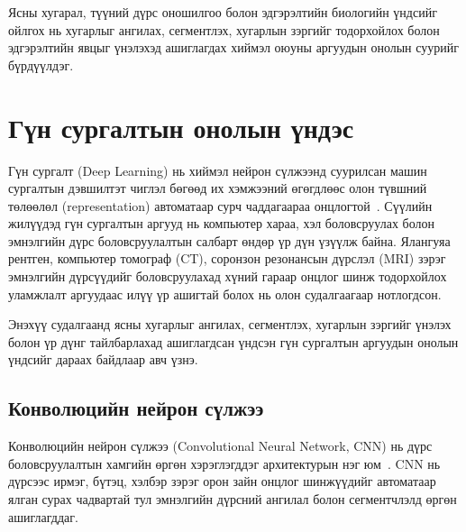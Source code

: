 Ясны хугарал, түүний дүрс оношилгоо болон эдгэрэлтийн биологийн үндсийг ойлгох нь хугарлыг ангилах, сегментлэх, хугарлын зэргийг тодорхойлох болон эдгэрэлтийн явцыг үнэлэхэд ашиглагдах хиймэл оюуны аргуудын онолын суурийг бүрдүүлдэг.

\section{Гүн сургалтын онолын үндэс}

Гүн сургалт (Deep Learning) нь хиймэл нейрон сүлжээнд суурилсан машин сургалтын дэвшилтэт чиглэл бөгөөд их хэмжээний өгөгдлөөс олон түвшний төлөөлөл (representation) автоматаар сурч чаддагаараа онцлогтой~\cite{ref31}. Сүүлийн жилүүдэд гүн сургалтын аргууд нь компьютер хараа, хэл боловсруулах болон эмнэлгийн дүрс боловсруулалтын салбарт өндөр үр дүн үзүүлж байна. Ялангуяа рентген, компьютер томограф (CT), соронзон резонансын дүрслэл (MRI) зэрэг эмнэлгийн дүрсүүдийг боловсруулахад хүний гараар онцлог шинж тодорхойлох уламжлалт аргуудаас илүү үр ашигтай болох нь олон судалгаагаар нотлогдсон.

Энэхүү судалгаанд ясны хугарлыг ангилах, сегментлэх, хугарлын зэргийг үнэлэх болон үр дүнг тайлбарлахад ашиглагдсан үндсэн гүн сургалтын аргуудын онолын үндсийг дараах байдлаар авч үзнэ.

\subsection*{Конволюцийн нейрон сүлжээ}

\begin{figure}[H]
    \centering
    \label{fig:cnn_arch}
\end{figure}

Конволюцийн нейрон сүлжээ (Convolutional Neural Network, CNN) нь дүрс боловсруулалтын хамгийн өргөн хэрэглэгддэг архитектурын нэг юм~\cite{lecun1998}. CNN нь дүрсээс ирмэг, бүтэц, хэлбэр зэрэг орон зайн онцлог шинжүүдийг автоматаар ялган сурах чадвартай тул эмнэлгийн дүрсний ангилал болон сегментчлэлд өргөн ашиглагддаг.

